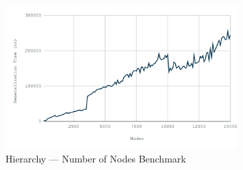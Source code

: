\begin{figure}[H]
    \centering
    \includegraphics[width=0.8\textwidth]{images/hierarchy-nodes.png}
    \caption{Hierarchy --- Number of Nodes Benchmark}\label{fig:hierarchy_nodes_bm}
\end{figure}